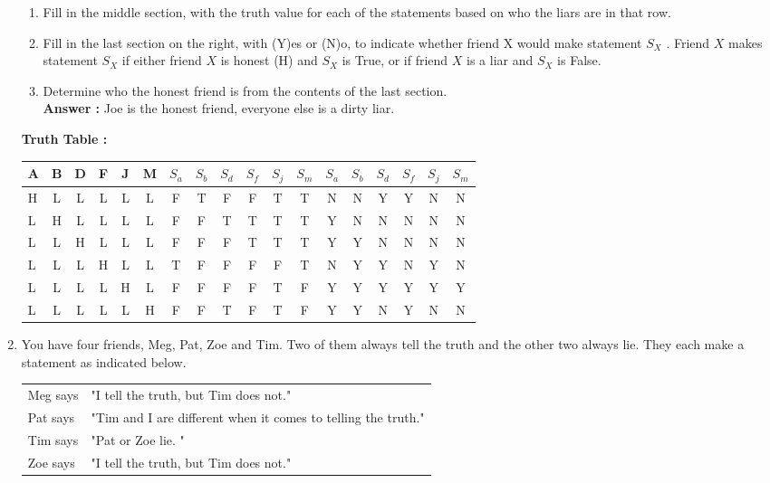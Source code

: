 \documentclass[a4paper,11pt]{article}
\newcommand{\answer}{\textbf{Answer : }}
\begin{document}
\begin{enumerate}
  \begin{enumerate}
  \item Fill in the middle section, with the truth value for each of the statements based on who the liars
  are in that row. 
  \item Fill in the last section on the right, with (Y)es or (N)o, to indicate whether friend X would make statement $S_X$ . Friend $X$ makes statement $S_X$ if either friend $X$ is honest (H) and $S_X$ is True, or if friend $X$ is a liar and $S_X$ is False.
  \item Determine who the honest friend is from the contents of the last section. \\ \answer Joe is the honest friend, everyone else is a dirty liar.
  \end{enumerate}
\textbf{Truth Table :} \\
\begin{tabular}{ l  c  c  c  c  c  ||  c  c  c  c  c  c  ||  c  c  c  c  c  c    }
 A & B & D & F & J & M  & $S_a$ & $S_b$ & $S_d$ & $S_f$ & $S_j$ & $S_m$  & $S_a$ & $S_b$ & $S_d$ & $S_f$ & $S_j$ & $S_m$ \\ \hline
  H & L & L & L & L & L   & F & T & F & F & T & T  & N & N & Y & Y & N & N \\
  L & H & L & L & L & L   & F & F & T & T & T & T  & Y & N & N & N & N & N \\ 
  L & L & H & L & L & L   & F & F & F & T & T & T  & Y & Y & N & N & N & N \\
  L & L & L & H & L & L   & T & F & F & F & F & T  & N & Y & Y & N & Y & N \\
  L & L & L & L & H & L   & F & F & F & F & T & F  & Y & Y & Y & Y & Y & Y \\
  L & L & L & L & L & H   & F & F & T & F & T & F  & Y & Y & N & Y & N & N \\
\end{tabular}




\newpage


\item You have four friends, Meg, Pat, Zoe and Tim. Two of them always tell the truth and the
other two always lie. They each make a statement as indicated below. \\[.2in]
\begin{tabular}{l l}
Meg says & "I tell the truth, but Tim does not." \\
Pat says & "Tim and I are different when it comes to telling the truth." \\
Tim says & "Pat or Zoe lie. " \\
Zoe says & "I tell the truth, but Tim does not." \\[.2in]
\end{tabular}


\end{enumerate}
\end{document}
